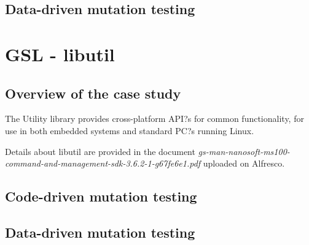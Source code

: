 
\subsection{Data-driven mutation testing}





\section{GSL - libutil}
\label{sec:caseStudies:GSL:libutil}

\subsection{Overview of the case study}

The Utility library provides cross-platform API?s for common functionality, for use in both embedded systems and standard PC?s running Linux. 

Details about libutil are provided in the document \emph{gs-man-nanosoft-ms100-command-and-management-sdk-3.6.2-1-g67fe6e1.pdf} uploaded on Alfresco.


\subsection{Code-driven mutation testing}



\subsection{Data-driven mutation testing}


